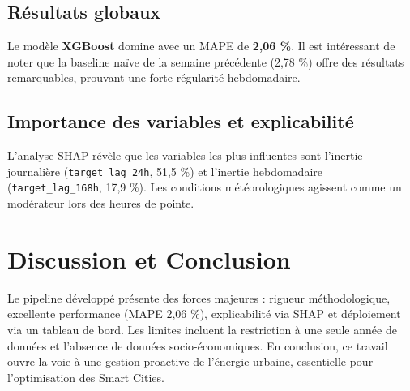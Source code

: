 \documentclass[12pt,a4paper]{article}
\begin{document}
\subsection{Résultats globaux}
\begin{table}[h]
\centering
{}
\caption{Performances des modèles sur le jeu de test}
\end{table}

Le modèle \textbf{XGBoost} domine avec un MAPE de \textbf{2,06 \%}. Il est intéressant de noter que la baseline naïve de la semaine précédente (2,78 \%) offre des résultats remarquables, prouvant une forte régularité hebdomadaire.

\subsection{Importance des variables et explicabilité}
L'analyse SHAP révèle que les variables les plus influentes sont l'inertie journalière (\texttt{target\_lag\_24h}, 51,5 \%) et l'inertie hebdomadaire (\texttt{target\_lag\_168h}, 17,9 \%). Les conditions météorologiques agissent comme un modérateur lors des heures de pointe.

\section{Discussion et Conclusion}
Le pipeline développé présente des forces majeures : rigueur méthodologique, excellente performance (MAPE 2,06 \%), explicabilité via SHAP et déploiement via un tableau de bord.
Les limites incluent la restriction à une seule année de données et l'absence de données socio-économiques.
En conclusion, ce travail ouvre la voie à une gestion proactive de l'énergie urbaine, essentielle pour l'optimisation des Smart Cities.
\end{document}
